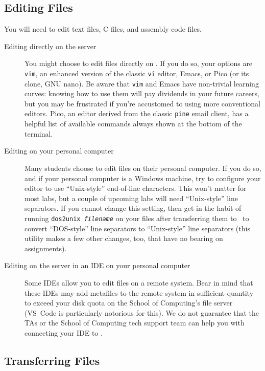\subsection{Editing Files}

You will need to edit text files, C files, and assembly code files.

\begin{description}
    \item[Editing directly on the server] You might choose to edit files directly on \runtimeenvironment.
        If you do so, your options are \texttt{vim}, an enhanced version of the classic \texttt{vi} editor, Emacs, or Pico (or its clone, GNU nano).
        Be aware that \texttt{vim} and Emacs have non-trivial learning curves: knowing how to use them will pay dividends in your future careers, but you may be frustrated if you're accustomed to using more conventional editors.
        Pico, an editor derived from the classic \texttt{pine} email client, has a helpful list of available commands always shown at the bottom of the terminal.
    \item[Editing on your personal computer] Many students choose to edit files on their personal computer.
        If you do so, and if your personal computer is a Windows machine, try to configure your editor to use ``Unix-style'' end-of-line characters.
        This won't matter for most labs, but a couple of upcoming labs will need ``Unix-style'' line separators.
        If you cannot change this setting, then get in the habit of running \texttt{dos2unix \textit{filename}} on your files after transferring them to \runtimeenvironment\ to convert ``DOS-style'' line separators to ``Unix-style'' line separators (this utility makes a few other changes, too, that have no bearing on \coursenumber assignments).
    \item[Editing on the server in an IDE on your personal computer] Some IDEs allow you to edit files on a remote system.
        Bear in mind that these IDEs may add metafiles to the remote system in sufficient quantity to exceed your disk quota on the School of Computing's file server (VS~Code is particularly notorious for this).
        We do not guarantee that the TAs or the School of Computing tech support team can help you with connecting your IDE to \runtimeenvironment.
\end{description}


\subsection{Transferring Files}

